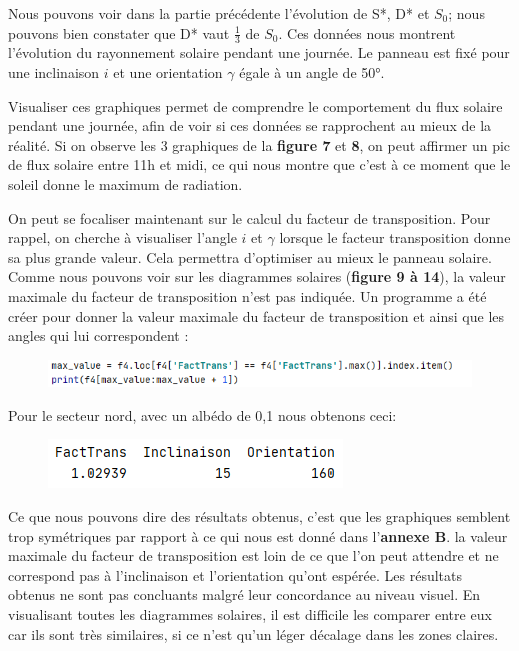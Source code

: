\documentclass[12pt,a4paper,openright]{report}
\begin{document}
Nous pouvons voir dans la partie précédente l'évolution de S*, D* et $S_0$; nous pouvons bien constater que D* vaut $\frac{1}{3}$ de $S_0$. Ces données nous montrent l'évolution du rayonnement solaire pendant une journée. Le panneau est fixé pour une inclinaison $i$ et une orientation $\gamma$ égale à un angle de 50°.

Visualiser ces graphiques permet de comprendre le comportement du flux solaire pendant une journée, afin de voir si ces données se rapprochent au mieux de la réalité. Si on observe les 3 graphiques de la \textbf{figure 7} et \textbf{8}, on peut affirmer un pic de flux solaire entre 11h et midi, ce qui nous montre que c'est à ce moment que le soleil donne le maximum de radiation.

On peut se focaliser maintenant sur le calcul du facteur de transposition. Pour rappel, on cherche à visualiser l'angle $i$ et $\gamma$ lorsque le facteur transposition donne sa plus grande valeur. Cela permettra d'optimiser au mieux le panneau solaire. Comme nous pouvons voir sur les diagrammes solaires (\textbf{figure 9 à 14}), la valeur maximale du facteur de transposition n'est pas indiquée. Un programme a été créer pour donner la valeur maximale du facteur de transposition et ainsi que les angles qui lui correspondent :

\begin{figure}[h]
\includegraphics[scale=0.6]{maxvalue}
\end{figure}

Pour le secteur nord, avec un albédo de 0,1 nous obtenons ceci:
\begin{figure}[h]
\includegraphics[scale=0.6]{ftigamma}
\end{figure}

Ce que nous pouvons dire des résultats obtenus, c'est que les graphiques semblent trop symétriques par rapport à ce qui nous est donné dans l'\textbf{annexe B}. la valeur maximale du facteur de transposition est loin de ce que l'on peut attendre et ne correspond pas à l'inclinaison et l'orientation qu'ont espérée. Les résultats obtenus ne sont pas concluants malgré leur concordance au niveau visuel. En visualisant toutes les diagrammes solaires, il est difficile les comparer entre eux car ils sont très similaires, si ce n'est qu'un léger décalage dans les zones claires.
\end{document}
